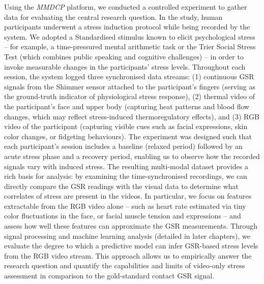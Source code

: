 \documentclass[11pt,a4paper]{report}
\begin{document}
Using the \textit{MMDCP} platform, we conducted a controlled experiment to gather data for evaluating the central research question. In the study, human participants underwent a stress induction protocol while being recorded by the system. We adopted a Standardised stimulus known to elicit psychological stress – for example, a time-pressured mental arithmetic task or the Trier Social Stress Test (which combines public speaking and cognitive challenges) – in order to invoke measurable changes in the participants’ stress levels. Throughout each session, the system logged three synchronised data streams: (1) continuous GSR signals from the Shimmer sensor attached to the participant’s fingers (serving as the ground-truth indicator of physiological stress response), (2) thermal video of the participant’s face and upper body (capturing heat patterns and blood flow changes, which may reflect stress-induced thermoregulatory effects), and (3) RGB video of the participant (capturing visible cues such as facial expressions, skin color changes, or fidgeting behaviours). The experiment was designed such that each participant’s session includes a baseline (relaxed period) followed by an acute stress phase and a recovery period, enabling us to observe how the recorded signals vary with induced stress. The resulting multi-modal dataset provides a rich basis for analysis: by examining the time-synchronised recordings, we can directly compare the GSR readings with the visual data to determine what correlates of stress are present in the videos. In particular, we focus on features extractable from the RGB video alone – such as heart rate estimated via tiny color fluctuations in the face, or facial muscle tension and expressions – and assess how well these features can approximate the GSR measurements. Through signal processing and machine learning analysis (detailed in later chapters), we evaluate the degree to which a predictive model can infer GSR-based stress levels from the RGB video stream. This approach allows us to empirically answer the research question and quantify the capabilities and limits of video-only stress assessment in comparison to the gold-standard contact GSR signal.
\end{document}
